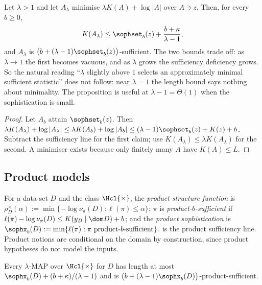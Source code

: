 \begin{proposition}\label{prop:algstat:set}
Let $\lambda>1$ and let $A_\lambda$ minimise $\lambda K(A)+\log|A|$ over $A\ni z$. Then, for every $b\ge0$,
\[
K(A_\lambda)\le\sophset_b(z)+\frac{b+\kappa}{\lambda-1},
\]
and $A_\lambda$ is $\big(b+(\lambda-1)\sophset_b(z)\big)$-sufficient.
The two bounds trade off: as $\lambda\to1$ the first becomes vacuous, and as $\lambda$ grows the sufficiency deficiency grows. So the natural reading ``$\lambda$ slightly above $1$ selects an approximately minimal sufficient statistic'' does not follow: near $\lambda=1$ the length bound says nothing about minimality. The proposition is useful at $\lambda-1=\Theta(1)$ when the sophistication is small.
\end{proposition}

\begin{proof}
Let $A_b$ attain $\sophset_b(z)$. Then $\lambda K(A_\lambda)+\log|A_\lambda|\le\lambda K(A_b)+\log|A_b|\le(\lambda-1)\sophset_b(z)+K(z)+b$. Subtract the sufficiency line for the first claim; use $K(A_\lambda)\le\lambda K(A_\lambda)$ for the second. A minimiser exists because only finitely many $A$ have $K(A)\le L$.
\end{proof}

\subsection{Product models}\label{sec:algstat:product}

\begin{definition}\label{def:algstat:product}
For a data set $D$ and the class $\Hcl{\times}$, the \emph{product structure function} is $\rho^\times_D(\alpha):=\min\{-\log\nu_\pi(D):\ell(\pi)\le\alpha\}$; $\pi$ is \emph{product-$b$-sufficient} if $\ell(\pi)-\log\nu_\pi(D)\le K(y_D\mid\dom D)+b$; and the \emph{product sophistication} is $\sophx_b(D):=\min\{\ell(\pi):\pi\text{ product-$b$-sufficient}\}$.  is the product sufficiency line. Product notions are conditional on the domain by construction, since product hypotheses do not model the inputs.
\end{definition}

\begin{proposition}\label{prop:algstat:product}
Every $\lambda$-MAP over $\Hcl{\times}$ for $D$ has length at most $\sophx_b(D)+(b+\kappa)/(\lambda-1)$ and is $\big(b+(\lambda-1)\sophx_b(D)\big)$-product-sufficient.
\end{proposition}

